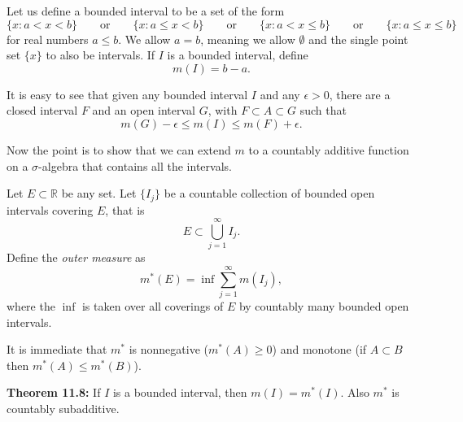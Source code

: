 \documentclass[12pt]{book}
\newcommand{\R}{{\mathbb{R}}}
\theoremstyle{plain}
\theoremstyle{remark}
\theoremstyle{definition}
\theoremstyle{exercise}
\theoremstyle{example}
\begin{document}
\medskip

Let us define a bounded interval to be a set of the form
$$
\{ x : a < x < b \}
\qquad \text{or} \qquad
\{ x : a \leq x < b \}
\qquad \text{or} \qquad
\{ x : a < x \leq b \}
\qquad \text{or} \qquad
\{ x : a \leq x \leq b \}
$$
for real numbers $a \leq b$.  We allow $a = b$, meaning we allow 
$\emptyset$ and the single point set $\{ x \}$ to also be intervals.
If $I$ is a bounded interval, define
$$
m(I) = b-a .
$$

%
%

It is easy to see that given any bounded interval $I$
and any $\epsilon > 0$, there are
a closed interval $F$ and an open interval $G$, with $F \subset A \subset G$
such that
$$
m(G) - \epsilon \leq m(I) \leq m(F) + \epsilon .
$$

Now the point is to show that we can extend $m$ to a countably additive
function on a $\sigma$-algebra that contains all the intervals.%

Let $E \subset \R$ be any set.  Let $\{ I_j \}$ be a countable
collection of bounded open intervals covering $E$,
that is
$$
E \subset \bigcup_{j=1}^\infty I_j .
$$
Define the \emph{outer measure}
as
$$
m^*(E) = \inf \sum_{j=1}^\infty m(I_j) ,
$$
where the $\inf$ is taken over all coverings of $E$ by countably many bounded open
intervals.

It is immediate that $m^*$ is nonnegative ($m^*(A) \geq 0$) and monotone (if $A \subset B$
then $m^*(A) \leq m^*(B)$).

\medskip

\textbf{Theorem 11.8:}
If $I$ is a bounded interval, then $m(I) = m^*(I)$.  Also $m^*$ is countably subadditive.

\medskip
\end{document}
